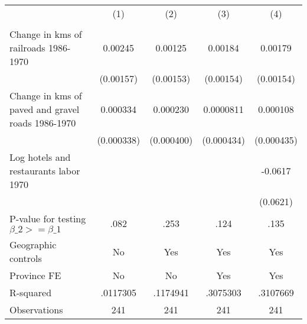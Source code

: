 {
\def\sym#1{\ifmmode^{#1}\else\(^{#1}\)\fi}
\begin{tabular}{l*{4}{c}}
\hline\hline
                &\multicolumn{1}{c}{(1)}&\multicolumn{1}{c}{(2)}&\multicolumn{1}{c}{(3)}&\multicolumn{1}{c}{(4)}\\
                &\multicolumn{1}{c}{}&\multicolumn{1}{c}{}&\multicolumn{1}{c}{}&\multicolumn{1}{c}{}\\
\hline
Change in kms of railroads 1986-1970&  0.00245         &  0.00125         &  0.00184         &  0.00179         \\
                &(0.00157)         &(0.00153)         &(0.00154)         &(0.00154)         \\
[1em]
Change in kms of paved and gravel roads 1986-1970& 0.000334         & 0.000230         &0.0000811         & 0.000108         \\
                &(0.000338)         &(0.000400)         &(0.000434)         &(0.000435)         \\
[1em]
Log hotels and restaurants labor 1970&                  &                  &                  &  -0.0617         \\
                &                  &                  &                  & (0.0621)         \\
\hline
P-value for testing $\beta\_{2} >= \beta\_{1}$&     .082         &     .253         &     .124         &     .135         \\
Geographic controls&       No         &      Yes         &      Yes         &      Yes         \\
Province FE     &       No         &       No         &      Yes         &      Yes         \\
R-squared       & .0117305         & .1174941         & .3075303         & .3107669         \\
Observations    &      241         &      241         &      241         &      241         \\
\hline\hline
\end{tabular}
}
